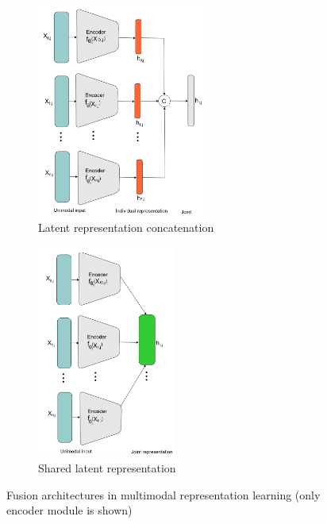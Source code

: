 \begin{figure}[htp!]
	\centering
	\begin{subfigure}{.48\linewidth}
		\centering
		\includegraphics[width=0.95\linewidth,height=70mm]{images/rl_1.png}
		\caption{Latent representation concatenation}
        \label{fig:lrc_1}
	\end{subfigure}
	\begin{subfigure}{0.48\linewidth}
		\centering
		\includegraphics[width=0.95\linewidth,height=70mm]{images/shared.png}
		\caption{Shared latent representation}
        \label{fig:slr_1}
	\end{subfigure}
	\caption{Fusion architectures in multimodal representation learning (only encoder module is shown)} 
	\label{fig:mm_rL_example}
\end{figure}

